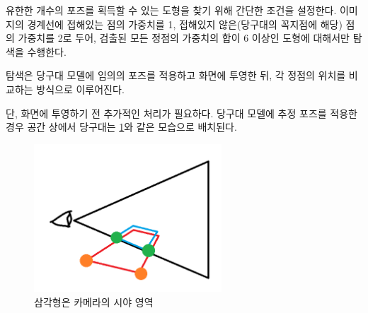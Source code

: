 \documentclass[10pt]{oblivoir}
\begin{document}
유한한 개수의 포즈를 획득할 수 있는 도형을 찾기 위해 간단한 조건을 설정한다. 이미지의 경계선에 접해있는 점의 가중치를 1, 접해있지 않은(당구대의 꼭지점에 해당) 점의 가중치를 2로 두어, 검출된 모든 정점의 가중치의 합이 6 이상인 도형에 대해서만 탐색을 수행한다. 

탐색은 당구대 모델에 임의의 포즈를 적용하고 화면에 투영한 뒤, 각 정점의 위치를 비교하는 방식으로 이루어진다. 

단, 화면에 투영하기 전 추가적인 처리가 필요하다. 당구대 모델에 추정 포즈를 적용한 경우 공간 상에서 당구대는 \cref{fig;invalid-sight-projection}와 같은 모습으로 배치된다. 

\begin{figure}[ht]
    \centering
    \includegraphics[width=7cm]{img/sight-invalid-culling.png}
    \caption{삼각형은 카메라의 시야 영역}
    \label{fig;invalid-sight-projection}
\end{figure}
\end{document}
